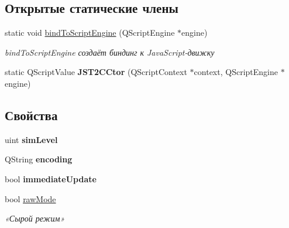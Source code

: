 \subsection*{Открытые статические члены}
\begin{DoxyCompactItemize}
\item 
static void \hyperlink{class_t2_c_manager_afd8d1c60c31904ee0d1e1bd45bd49164}{bind\-To\-Script\-Engine} (Q\-Script\-Engine $\ast$engine)
\begin{DoxyCompactList}\small\item\em bind\-To\-Script\-Engine создаёт биндинг к Java\-Script-\/движку \end{DoxyCompactList}\item 
\hypertarget{class_t2_c_manager_a0b248b9f75894efe6024e43def759e78}{static Q\-Script\-Value {\bfseries J\-S\-T2\-C\-Ctor} (Q\-Script\-Context $\ast$context, Q\-Script\-Engine $\ast$engine)}\label{class_t2_c_manager_a0b248b9f75894efe6024e43def759e78}

\end{DoxyCompactItemize}
\subsection*{Свойства}
\begin{DoxyCompactItemize}
\item 
\hypertarget{class_t2_c_manager_aab5cd5149e7d3a3831c1298f095650d4}{uint {\bfseries sim\-Level}}\label{class_t2_c_manager_aab5cd5149e7d3a3831c1298f095650d4}

\item 
\hypertarget{class_t2_c_manager_a478a1d26f29db7db047e3e0749fd0642}{Q\-String {\bfseries encoding}}\label{class_t2_c_manager_a478a1d26f29db7db047e3e0749fd0642}

\item 
\hypertarget{class_t2_c_manager_a8ca8de7d555ab3ba5aa5ae3789f1107c}{bool {\bfseries immediate\-Update}}\label{class_t2_c_manager_a8ca8de7d555ab3ba5aa5ae3789f1107c}

\item 
\hypertarget{class_t2_c_manager_abb077bec336cee71d08d2a80277a0134}{bool \hyperlink{class_t2_c_manager_abb077bec336cee71d08d2a80277a0134}{raw\-Mode}}\label{class_t2_c_manager_abb077bec336cee71d08d2a80277a0134}

\begin{DoxyCompactList}\small\item\em «Сырой режим» \end{DoxyCompactList}\end{DoxyCompactItemize}


